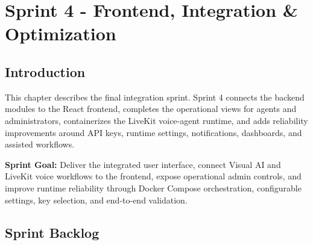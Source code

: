 
\chapter{Sprint 4 - Frontend, Integration \& Optimization}
\label{chap:sprint4}

\section*{Introduction}

\noindent This chapter describes the final integration sprint. Sprint 4 connects the backend modules to the React frontend, completes the operational views for agents and administrators, containerizes the LiveKit voice-agent runtime, and adds reliability improvements around API keys, runtime settings, notifications, dashboards, and assisted workflows.

\medskip

\textbf{Sprint Goal:} Deliver the integrated user interface, connect Visual AI and LiveKit voice workflows to the frontend, expose operational admin controls, and improve runtime reliability through Docker Compose orchestration, configurable settings, key selection, and end-to-end validation.

\section{Sprint Backlog}

